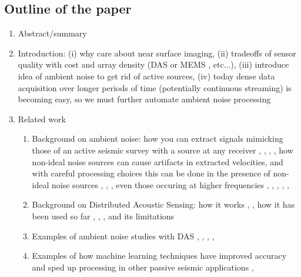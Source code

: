 \documentclass[11pt]{article}
\begin{document}
\vspace{-0.3cm}
\subsection*{Outline of the paper}
	\begin{enumerate}
	\vspace{-0.2cm}
	\item Abstract/summary
	\vspace{-0.2cm}
	\item Introduction: (i) why care about near surface imaging, (ii) tradeoffs of sensor quality with cost and array density (DAS or MEMS \cite{Evans2014}, etc...), (iii) introduce idea of ambient noise to get rid of active sources, (iv) today dense data acquisition over longer periods of time (potentially continuous streaming) is becoming easy, so we must further automate ambient noise processing 
	\vspace{-0.6cm}
	\item Related work
		\begin{enumerate}
		\vspace{-0.2cm}
		\item Background on ambient noise: how you can extract signals mimicking those of an active seismic survey with a source at any receiver \cite{Lobkis2001}, \cite{Lin2008}, \cite{Wapenaar2010A}, \cite{Wapenaar2010B}, how non-ideal noise sources can cause artifacts in extracted velocities, and with careful processing choices this can be done in the presence of non-ideal noise sources \cite{Bensen2007}, \cite{Daskalakis2016}, \cite{Zhan2013}, even those occuring at higher frequencies \cite{Girard2016}, \cite{Martin2015}, \cite{Martin2016}, \cite{Nakata2011}, \cite{Nakata2015}, \cite{Zeng2017}
		\vspace{-0.1cm}
		\item Background on Distributed Acoustic Sensing: how it works \cite{Posey2000}, \cite{Bakku2015}, how it has been used so far \cite{Daley2013}, \cite{Webster2013}, \cite{Mateeva2014}, and its limitations \cite{Kuvshinov2016}
		\vspace{-0.1cm}
		\item Examples of ambient noise studies with DAS \cite{AjoFranklin2015}, \cite{Martin2015}, \cite{Martin2016}, \cite{Martin2017}, \cite{Zeng2017}
		\vspace{-0.1cm}
		\item Examples of how machine learning techniques have improved accuracy and sped up processing in other passive seismic applications \cite{Fisher2016}, \cite{Yoon2015}

\end{enumerate}
\end{enumerate}
\end{document}
